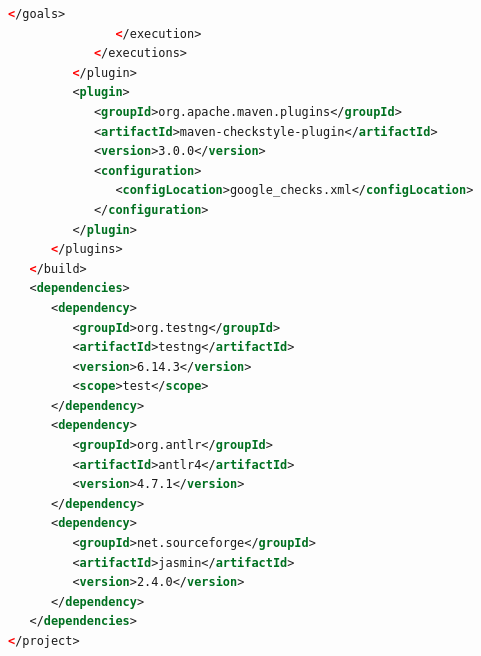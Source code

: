 \begin{lstlisting}[language=XML, frame=htrbl, caption={Implementation of {\ttfamily pom.xml}}, label={lst:maven}, basicstyle=\footnotesize]
                  </goals>
               </execution>
            </executions>
         </plugin>
         <plugin>
            <groupId>org.apache.maven.plugins</groupId>
            <artifactId>maven-checkstyle-plugin</artifactId>
            <version>3.0.0</version>
            <configuration>
               <configLocation>google_checks.xml</configLocation>
            </configuration>
         </plugin>
      </plugins>
   </build>
   <dependencies>
      <dependency>
         <groupId>org.testng</groupId>
         <artifactId>testng</artifactId>
         <version>6.14.3</version>
         <scope>test</scope>
      </dependency>
      <dependency>
         <groupId>org.antlr</groupId>
         <artifactId>antlr4</artifactId>
         <version>4.7.1</version>
      </dependency>
      <dependency>
         <groupId>net.sourceforge</groupId>
         <artifactId>jasmin</artifactId>
         <version>2.4.0</version>
      </dependency>
   </dependencies>
</project>
\end{lstlisting}

\newpage

